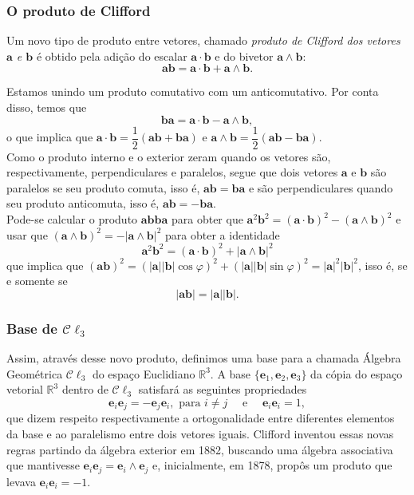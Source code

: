 \documentclass[a4paper,12pt]{report}
\theoremstyle{plain}
\theoremstyle{definition}
\newcommand{\norm}[1]{\left| #1 \right|}
\begin{document}
	\subsubsection{O produto de Clifford}
	
	Um novo tipo de produto entre vetores, chamado \emph{produto de Clifford dos vetores $\mathbf a$ e $\mathbf b$} é obtido pela adição do escalar $\mathbf a\cdot \mathbf b$ e do bivetor $\mathbf a\wedge\mathbf b$: $$\mathbf a\mathbf b = \mathbf a\cdot \mathbf b + \mathbf a\wedge \mathbf b.$$
	
	Estamos unindo um produto comutativo com um anticomutativo. Por conta disso, temos que $$\mathbf b\mathbf a = \mathbf a\cdot \mathbf b - \mathbf a\wedge\mathbf b,$$
	o que implica que $\mathbf a\cdot \mathbf b = \dfrac 1 2 (\mathbf a\mathbf b + \mathbf b\mathbf a)$ e $\mathbf a\wedge \mathbf b = \dfrac 1 2 (\mathbf a\mathbf b - \mathbf b\mathbf a)$.
	\\
	
	Como o produto interno e o exterior zeram quando os vetores são, respectivamente, perpendiculares e paralelos, segue que dois vetores $\mathbf a$ e $\mathbf b$ são paralelos se seu produto comuta, isso é, $\mathbf a \mathbf b = \mathbf b \mathbf a$ e são perpendiculares quando seu produto anticomuta, isso é, $\mathbf a\mathbf b = -\mathbf b\mathbf a$.
	\\
	
	Pode-se calcular o produto $\mathbf a\mathbf b\mathbf b\mathbf a$ para obter que $\mathbf a^2\mathbf b^2 = (\mathbf a\cdot \mathbf b)^2 - (\mathbf a\wedge \mathbf b)^2$ e usar que $(\mathbf a\wedge\mathbf b)^2 = -\norm{\mathbf a\wedge\mathbf b}^2$ para obter a identidade
	$$\mathbf a^2\mathbf b^2 = (\mathbf a\cdot\mathbf b)^2 + \norm{\mathbf a\wedge\mathbf b}^2$$
	que implica que $(\mathbf a\mathbf b)^2 = (\norm{\mathbf a}\norm{\mathbf b}\cos\varphi)^2 + (\norm{\mathbf a}\norm{\mathbf b}\sin\varphi)^2 = \norm{\mathbf a}^2\norm{\mathbf b}^2$, isso é, se e somente se $$\norm{\mathbf a\mathbf b} = \norm{\mathbf a}\norm{\mathbf b}.$$
	
	\subsubsection{Base de $\mathcal C \ell_3$}
	
	Assim, através desse novo produto, definimos uma base para a chamada Álgebra Geométrica $\mathcal C \ell_3$ do espaço Euclidiano $\mathbb{R}^3$. A base $\{\mathbf e_1,\mathbf e_2,\mathbf e_3\}$ da cópia do espaço vetorial $\mathbb{R}^3$ dentro de $\mathcal C \ell_3$ satisfará as seguintes propriedades
	$$\mathbf e_i\mathbf e_j = -\mathbf e_j\mathbf e_i, \text{ para } i\neq j\quad\text{ e }\quad \mathbf e_i\mathbf e_i = 1,$$
	que dizem respeito respectivamente a ortogonalidade entre diferentes elementos da base e ao paralelismo entre dois vetores iguais. Clifford inventou essas novas regras partindo da álgebra exterior em 1882, buscando uma álgebra associativa que mantivesse $\mathbf e_i\mathbf e_j = \mathbf e_i\wedge\mathbf e_j$ e, inicialmente, em 1878, propôs um produto que levava $\mathbf e_i\mathbf e_i = -1$.
	
\end{document}

